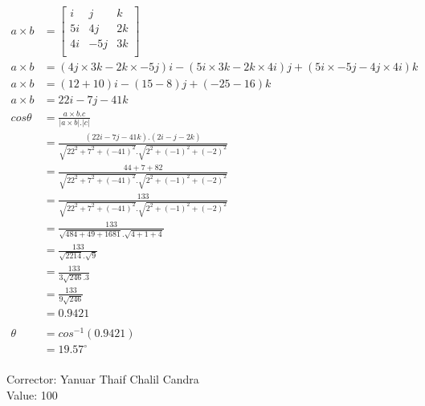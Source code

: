 \documentclass[12pt,titlepage]{article}
\begin{document}
\begin{enumerate}
{        \begin{align*}
            a \times b &= \left[\begin{matrix}
                i  &  j &  k \\
                5i & 4j & 2k \\
                4i & -5j & 3k \\
            \end{matrix}\right]\\
            a \times b &= (4j \times 3k - 2k \times -5j)i - (5i \times 3k - 2k \times 4i)j + (5i \times -5j - 4j \times 4i)k \\
            a \times b &= (12 + 10)i - (15 - 8)j + (-25 - 16)k\\
            a \times b &= 22i - 7j - 41k\\
            cos\theta &= \frac{a \times b . c}{|a \times b| . |c|}\\
            &= \frac{(22i - 7j - 41k).(2i - j - 2k)}{\sqrt{22^2 + 7^2 + (-41)^2}.\sqrt{2^2 + (-1)^2 + (-2)^2}}\\
            &= \frac{44 + 7 + 82}{\sqrt{22^2 + 7^2 + (-41)^2}.\sqrt{2^2 + (-1)^2 + (-2)^2}}\\
            &= \frac{133}{\sqrt{22^2 + 7^2 + (-41)^2}.\sqrt{2^2 + (-1)^2 + (-2)^2}}\\
            &= \frac{133}{\sqrt{484 + 49 + 1681}.\sqrt{4 + 1 + 4}}\\
            &= \frac{133}{\sqrt{2214}.\sqrt{9}}\\
            &= \frac{133}{3\sqrt{246}.3}\\
            &= \frac{133}{9\sqrt{246}}\\
            &= 0.9421\\
            \\
            \theta &= cos^{-1}(0.9421)\\
            &= 19.57^{\circ}\\
        \end{align*}
    }
\end{enumerate}

Corrector: Yanuar Thaif Chalil Candra\\
Value: 100
\end{document}
